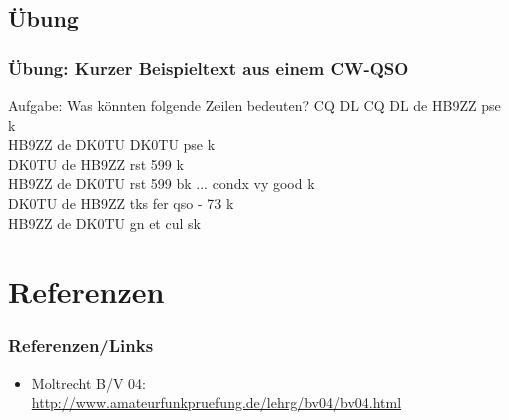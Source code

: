 \subsection*{Übung}
\begin{frame}
    \frametitle{Übung: Kurzer Beispieltext aus einem CW-QSO}

    \begin{exampleblock}{Aufgabe: Was könnten folgende Zeilen bedeuten?}
        CQ DL CQ DL de HB9ZZ pse k \\
        HB9ZZ de DK0TU DK0TU pse k \\
        DK0TU de HB9ZZ rst 599 k\\
        HB9ZZ de DK0TU rst 599 bk ... condx vy good k \\
        DK0TU de HB9ZZ tks fer qso - 73 k \\
        HB9ZZ de DK0TU gn et cul sk \\
    \end{exampleblock}

\end{frame}

\section*{Referenzen}

\begin{frame}
    \frametitle{Referenzen/Links}
    
    \footnotesize
    \begin{itemize}
        \item Moltrecht B/V 04: \\
              \url{http://www.amateurfunkpruefung.de/lehrg/bv04/bv04.html}
    \end{itemize}

\end{frame}


